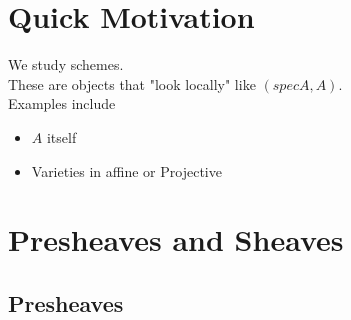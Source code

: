 \documentclass[../main.tex]{subfiles}
\begin{document}
\section*{Quick Motivation}
We study schemes.\\
These are objects that "look locally" like $( spec A, A ) $.\\
Examples include
\begin{itemize}
\item $A$ itself
\item Varieties in affine or Projective 
\end{itemize}
\section{Presheaves and Sheaves}
\subsection{Presheaves}
\end{document}
